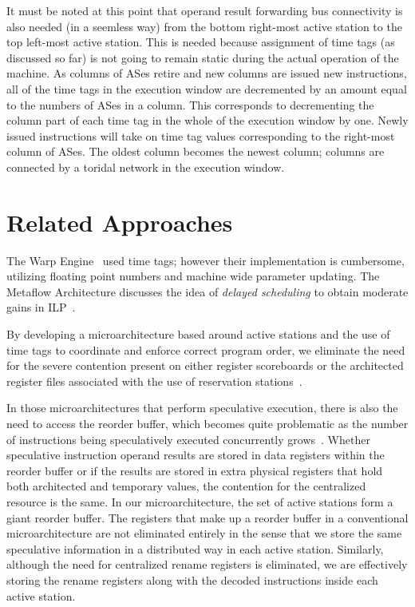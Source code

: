 \documentclass[10pt,twocolumn,dvips]{article}
\begin{document}
It must be noted at this point that operand result forwarding
bus connectivity is also needed (in a seemless way) from the bottom
right-most active station to the top left-most active station.
This is needed because assignment of time tags (as discussed so far)
is not going to remain static during the actual operation of the machine.
As columns of ASes retire and new columns are issued new instructions,
all of the time tags in the execution window are decremented by
an amount equal to the numbers of ASes in a column.  This corresponds
to decrementing the column part of each time tag in the whole of the
execution window by one.  Newly issued instructions will take on
time tag values corresponding to the right-most 
column of ASes.  The oldest column becomes the 
newest column; columns are connected by a toridal network in the
execution window.
\vspace{-0.2in}
\section{Related Approaches}
\vspace{-0.1in}
The Warp Engine~\cite{Cleary95} used time tags; however their implementation
is cumbersome, utilizing floating point numbers and machine wide parameter
updating.  The Metaflow Architecture discusses the 
idea of {\em delayed scheduling}
to obtain moderate gains in ILP~\cite{Pop}.

By developing a microarchitecture based around active stations
and the use of time tags to coordinate and enforce correct program
order, we eliminate the need for the severe contention present 
on either register scoreboards \cite{Thornton64} 
or the architected register files associated
with the use of reservation stations~\cite{Anderson67}.  

In those microarchitectures
that perform speculative execution, there is also
the need to access the reorder buffer, which becomes quite problematic
as the number of instructions being speculatively executed concurrently
grows~\cite{Palacharla}.  Whether speculative instruction operand
results are stored in data registers within the reorder buffer or if the
results are stored in extra physical registers that hold both architected
and temporary values, the contention for the centralized resource is
the same.  In our microarchitecture, the set of active
stations form a giant reorder buffer.  The registers that
make up a reorder buffer in a conventional microarchitecture are
not eliminated entirely in the sense that we store the same speculative
information in a distributed way in each active station.  Similarly,
although the need for centralized rename registers is eliminated,
we are effectively storing the rename registers along with the
decoded instructions inside each active station.  
\vspace{-0.2in}
\end{document}

